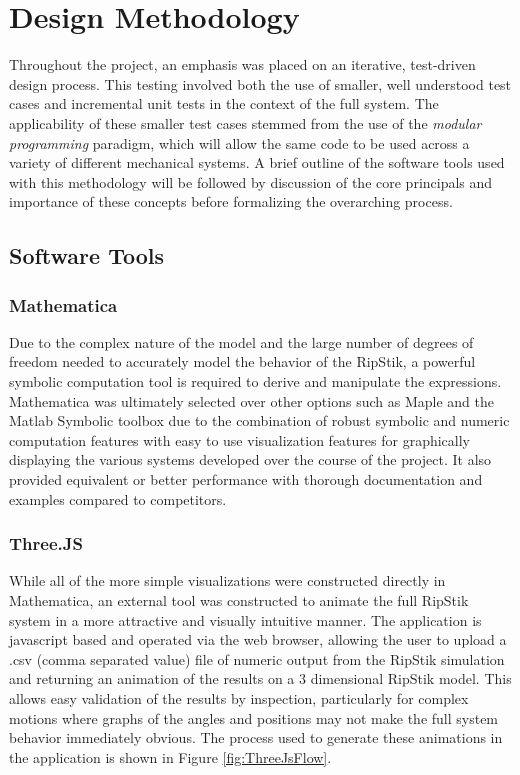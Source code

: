 \section{Design Methodology}
Throughout the project, an emphasis was placed on an iterative, test-driven design process. This testing involved both the use of smaller, well understood test cases and incremental unit tests in the context of the full system. 
The applicability of these smaller test cases stemmed from the use of the \textit{modular programming} paradigm, which will allow the same code to be used across a variety of different mechanical systems. 
A brief outline of the software tools used with this methodology will be followed by discussion of the core principals and importance of these concepts before formalizing the overarching process.
\subsection{Software Tools}
\subsubsection{Mathematica}
Due to the complex nature of the model and the large number of degrees of freedom needed to accurately model the behavior of the RipStik, a powerful symbolic computation tool is required to derive and manipulate the expressions. 
Mathematica was ultimately selected over other options such as Maple and the Matlab Symbolic toolbox due to the combination of robust symbolic and numeric computation features with easy to use visualization features for graphically displaying the various systems developed over the course of the project.
It also provided equivalent or better performance with thorough documentation and examples compared to competitors.
\subsubsection{Three.JS}
While all of the more simple visualizations were constructed directly in Mathematica, an external tool was constructed to animate the full RipStik system in a more attractive and visually intuitive manner. 
The application is javascript based and operated via the web browser, allowing the user to upload a .csv (comma separated value) file of numeric output from the RipStik simulation and returning an animation of the results on a 3 dimensional RipStik model. 
This allows easy validation of the results by inspection, particularly for complex motions where graphs of the angles and positions may not make the full system behavior immediately obvious.
The process used to generate these animations in the application is shown in Figure \ref{fig:ThreeJsFlow}.


